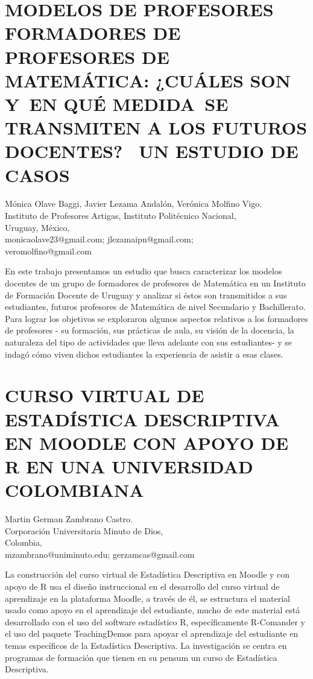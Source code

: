 \section{MODELOS DE PROFESORES FORMADORES DE PROFESORES DE MATEMÁTICA: ¿CUÁLES
SON Y EN QUÉ MEDIDA SE TRANSMITEN A LOS FUTUROS DOCENTES?  UN ESTUDIO
DE CASOS }

\begin{datos}
Mónica Olave Baggi, Javier Lezama Andalón, Verónica Molfino Vigo. \\
Instituto de Profesores Artigas, Instituto Politécnico Nacional, \\
\hfill Uruguay, México, \\
\hfill monicaolave23@gmail.com; jlezamaipn@gmail.com;\\\hfill veromolfino@gmail.com
\end{datos}

En este trabajo presentamos un estudio que busca caracterizar los
modelos docentes de un grupo de formadores de profesores de Matemática
en un Instituto de Formación Docente de Uruguay y analizar si éstos
son transmitidos a sus estudiantes, futuros profesores de Matemática
de nivel Secundario y Bachillerato. Para lograr los objetivos se exploraron
algunos aspectos relativos a los formadores de profesores - su formación,
sus prácticas de aula, su visión de la docencia, la naturaleza del
tipo de actividades que lleva adelante con sus estudiantes- y se indagó
cómo viven dichos estudiantes la experiencia de asistir a esas clases. 


\section{CURSO VIRTUAL DE ESTADÍSTICA DESCRIPTIVA EN MOODLE CON APOYO DE R
EN UNA UNIVERSIDAD COLOMBIANA}

\begin{datos}
Martin German Zambrano Castro. \\
Corporación Universitaria Minuto de Dios, \\
\hfill Colombia, \\
\hfill mzambrano@uniminuto.edu; gerzamcas@gmail.com
\end{datos}

La construcción del curso virtual de Estadística Descriptiva en Moodle
y con apoyo de R usa el diseño instruccional en el desarrollo del
curso virtual de aprendizaje en la plataforma Moodle, a través de
él, se estructura el material usado como apoyo en el aprendizaje del
estudiante, mucho de este material está desarrollado con el uso del
software estadístico R, específicamente R-Comander y el uso del paquete
TeachingDemos para apoyar el aprendizaje del estudiante en temas específicos
de la Estadística Descriptiva. La investigación se centra en programas
de formación que tienen en su pensum un curso de Estadística Descriptiva.


